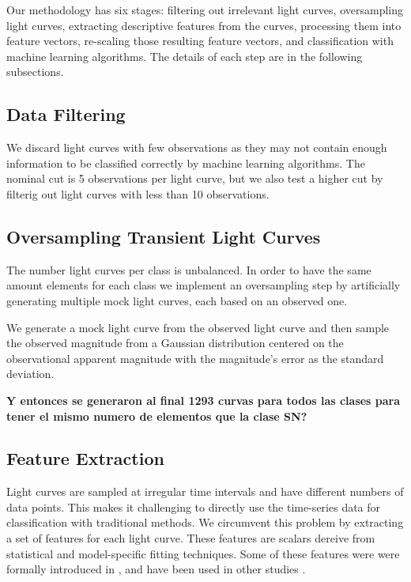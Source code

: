 Our methodology has six stages: 
filtering out irrelevant light curves, oversampling light curves, extracting
descriptive features from the curves, processing them into feature
vectors, re-scaling those resulting feature vectors, and 
classification with machine learning algorithms. 
The details of each step are in the following subsections.

\subsection{Data Filtering} \label{subsection_filtering}

We discard light curves with few observations as they may not contain
enough information to be classified correctly by machine learning
algorithms.  
The nominal cut is 5 observations per light curve, but we also test a
higher cut by filterig out light curves with less than 10 observations.

\subsection{Oversampling Transient Light Curves} \label{subsection_oversampling}

The number light curves per class is unbalanced. 
In order to have the same amount elements for each class we implement an
oversampling step by artificially generating multiple mock light curves,
each based on an observed one. 

We generate a mock light curve from the observed light curve and 
then sample the observed magnitude from a Gaussian distribution
centered on the observational apparent magnitude with the magnitude's
error as the  standard deviation. 

{\bf Y entonces se generaron al final 1293 curvas para todos las
  clases para tener el mismo numero de elementos que la clase SN?}

\subsection{Feature Extraction} \label{subsection_extraction}

Light curves are sampled at irregular time intervals and have
different numbers of data points.
This makes it challenging to directly use the time-series data for
classification with traditional methods. 
We circumvent this problem by extracting a set of features for each
light curve.
These features are scalars dereive from statistical and model-specific
fitting techniques.
Some of these features were  were formally introduced in
\cite{1101.1959}, and have been used in other studies
\citep{1603.00882,1601.03931}.  

